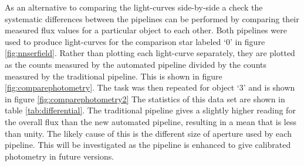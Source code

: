 

As an alternative to comparing the light-curves side-by-side a check the systematic differences between the pipelines can be performed by comparing their measured flux values for a particular object to each other. Both pipelines were used to produce light-curves for the comparison star labeled `0' in figure \ref{fig:nnserfield}. Rather than plotting each light-curve separately, they are plotted as the counts measured by the automated pipeline divided by the counts measured by the traditional pipeline. This is shown in figure \ref{fig:comparephotometry}. The task was then repeated for object `3' and is shown in figure \ref{fig:comparephotometry2} The statistics of this data set are shown in table \ref{tab:differential}. The traditional pipeline gives a slightly higher reading for the overall flux than the new automated pipeline, resulting in a mean that is less than unity. The likely cause of this is the different size of aperture used by each pipeline. This will be investigated as the pipeline is enhanced to give calibrated photometry in future versions. 

